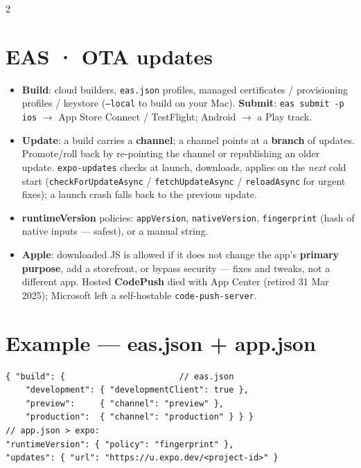 \documentclass[8pt]{extarticle}
\begin{document}
\begin{multicols}{2}
\section{EAS · OTA updates}
\begin{itemize}
  \item \textbf{Build}: cloud builders, \texttt{eas.json} profiles, managed certificates /
        provisioning profiles / keystore (\texttt{--local} to build on your Mac).
        \textbf{Submit}: \texttt{eas submit -p ios} $\to$ App Store Connect / TestFlight;
        Android $\to$ a Play track.
  \item \textbf{Update}: a build carries a \textbf{channel}; a channel points at a
        \textbf{branch} of updates. Promote/roll back by re-pointing the channel or
        republishing an older update. \texttt{expo-updates} checks at launch, downloads,
        applies on the \emph{next} cold start (\texttt{checkForUpdateAsync} /
        \texttt{fetchUpdateAsync} / \texttt{reloadAsync} for urgent fixes); a launch
        crash falls back to the previous update.
  \item \textbf{runtimeVersion} policies: \texttt{appVersion}, \texttt{nativeVersion},
        \texttt{fingerprint} (hash of native inputs — safest), or a manual string.
  \item \textbf{Apple}: downloaded JS is allowed if it does not change the app's
        \textbf{primary purpose}, add a storefront, or bypass security — fixes and tweaks,
        not a different app\unverified. Hosted \textbf{CodePush} died with App Center (retired
        31 Mar 2025); Microsoft left a self-hostable \texttt{code-push-server}.
\end{itemize}

\section{Example — eas.json + app.json}
\begin{lstlisting}[language=JSONSheet]
{ "build": {                       // eas.json
    "development": { "developmentClient": true },
    "preview":     { "channel": "preview" },
    "production":  { "channel": "production" } } }
// app.json > expo:
"runtimeVersion": { "policy": "fingerprint" },
"updates": { "url": "https://u.expo.dev/<project-id>" }
\end{lstlisting}

\columnbreak


\end{multicols}
\end{document}
